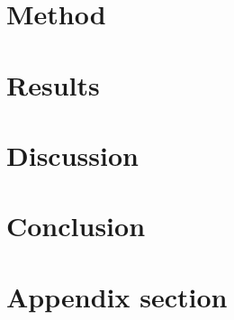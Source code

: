 \documentclass[aps,reprint]{revtex4-1}
\newcommand\blankpage{%
  \null
  \thispagestyle{empty}%
  \addtocounter{page}{-1}%
  \newpage}
\begin{document}
\section{Method} \label{sec:method}
\section{Results} \label{sec:results}
\section{Discussion} \label{sec:discussion}
\section{Conclusion} \label{sec:conclusion}

\blankpage
\appendix
\section{Appendix section} \label{sec:label}

\blankpage
\end{document}
